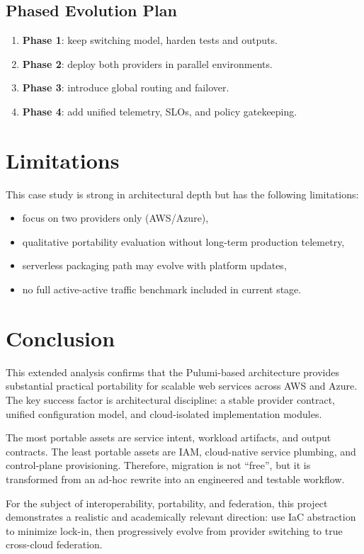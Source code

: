 \documentclass[conference]{IEEEtran}
\begin{document}
\subsection{Phased Evolution Plan}
\begin{enumerate}
    \item \textbf{Phase 1}: keep switching model, harden tests and outputs.
    \item \textbf{Phase 2}: deploy both providers in parallel environments.
    \item \textbf{Phase 3}: introduce global routing and failover.
    \item \textbf{Phase 4}: add unified telemetry, SLOs, and policy gatekeeping.
\end{enumerate}

\section{Limitations}
This case study is strong in architectural depth but has the following limitations:
\begin{itemize}
    \item focus on two providers only (AWS/Azure),
    \item qualitative portability evaluation without long-term production telemetry,
    \item serverless packaging path may evolve with platform updates,
    \item no full active-active traffic benchmark included in current stage.
\end{itemize}

\section{Conclusion}
This extended analysis confirms that the Pulumi-based architecture provides substantial practical portability for scalable web services across AWS and Azure. The key success factor is architectural discipline: a stable provider contract, unified configuration model, and cloud-isolated implementation modules.

The most portable assets are service intent, workload artifacts, and output contracts. The least portable assets are IAM, cloud-native service plumbing, and control-plane provisioning. Therefore, migration is not ``free'', but it is transformed from an ad-hoc rewrite into an engineered and testable workflow.

For the subject of interoperability, portability, and federation, this project demonstrates a realistic and academically relevant direction: use IaC abstraction to minimize lock-in, then progressively evolve from provider switching to true cross-cloud federation.
\end{document}
